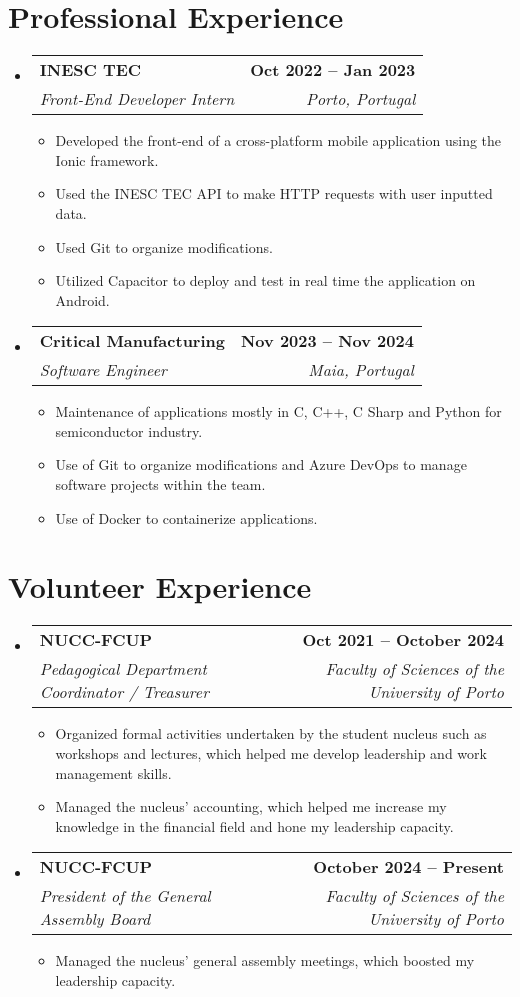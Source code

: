 \documentclass[letterpaper,11pt]{article}
\makeatletter
\newcommand{\resumeItem}[1]{
  \item\small{
    {#1 \vspace{-2pt}}
  }
}
\newcommand{\resumeSubheading}[4]{
  \vspace{-2pt}\item
    \begin{tabular*}{1.0\textwidth}[t]{l@{\extracolsep{\fill}}r}
      \textbf{#1} & \textbf{\small #2} \\
      \textit{\small#3} & \textit{\small #4} \\
    \end{tabular*}\vspace{-7pt}
}
\newcommand{\resumeSubHeadingListStart}{\begin{itemize}[leftmargin=0.0in, label={}]}
\newcommand{\resumeSubHeadingListEnd}{\end{itemize}}
\newcommand{\resumeItemListStart}{\begin{itemize}}
\newcommand{\resumeItemListEnd}{\end{itemize}\vspace{-5pt}}
\makeatother
\begin{document}
\section{Professional Experience}
  \resumeSubHeadingListStart
    \resumeSubheading
      {INESC TEC}{Oct 2022 -- Jan 2023}
      {Front-End Developer Intern}{Porto, Portugal}
      \resumeItemListStart
        \resumeItem{Developed the front-end of a cross-platform mobile application using the Ionic framework.}
        \resumeItem{Used the INESC TEC API to make HTTP requests with user inputted data.}
        \resumeItem{Used Git to organize modifications.}
        \resumeItem{Utilized Capacitor to deploy and test in real time the application on Android.}
    \resumeItemListEnd
    \resumeSubheading
      {Critical Manufacturing}{Nov 2023 -- Nov 2024}
      {Software Engineer}{Maia, Portugal}
      \resumeItemListStart
        \resumeItem{Maintenance of applications mostly in C, C++, C Sharp and Python for semiconductor industry.}
        \resumeItem{Use of Git to organize modifications and Azure DevOps to manage software projects within the team.}
        \resumeItem{Use of Docker to containerize applications.}
    \resumeItemListEnd
    \resumeSubHeadingListEnd
\vspace{-16pt}

\section{Volunteer Experience}
    \resumeSubHeadingListStart
        \resumeSubheading{NUCC-FCUP}{Oct 2021 -- October 2024}{Pedagogical Department Coordinator / Treasurer}{Faculty of Sciences of the University of Porto}
            \resumeItemListStart
                \resumeItem{Organized formal activities undertaken by the student nucleus such as workshops and lectures, which helped me develop leadership and work management skills.}
                \resumeItem{Managed the nucleus' accounting, which helped me increase my knowledge in the financial field and hone my leadership capacity.}
            \resumeItemListEnd
        \resumeSubheading{NUCC-FCUP}{October 2024 -- Present}{President of the General Assembly Board}{Faculty of Sciences of the University of Porto}
            \resumeItemListStart
                \resumeItem{Managed the nucleus' general assembly meetings, which boosted my leadership capacity.}
            \resumeItemListEnd
  \resumeSubHeadingListEnd
\vspace{-16pt}
\end{document}
